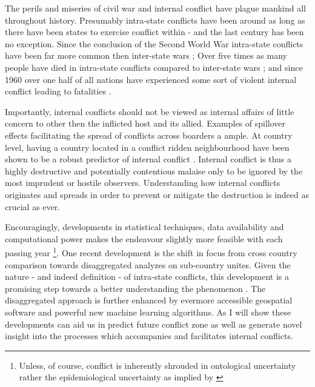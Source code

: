 \documentclass[a4paper]{article}
\begin{document}
The perils and miseries of civil war and internal conflict have plague mankind all throughout history. Presumably intra-state conflicts have been around as long as there have been states to exercise conflict within - and the last century has been no exception. Since the conclusion of the Second World War intra-state conflicts have been far more common then inter-state wars \citep[563]{Collier_Hoeffler_2004}; Over five times as many people have died in intra-state conflicts compared to inter-state wars \citep[563]{Collier_Hoeffler_2004}; and since 1960 over one half of all nations have experienced some sort of violent internal conflict leading to fatalities \citep[3-4]{Blattman_Miguel_2010}.\par

Importantly, internal conflicts should not be viewed as internal affairs of little concern to other then the inflicted host and its allied. Examples of spillover effects facilitating the spread of conflicts across boarders a ample. At country level, having a country located in a conflict ridden neighbourhood have been shown to be a robust predictor of internal conflict \citep{Hegre_Sambanis_2006,Goldstone_2010}. Internal conflict is thus a highly destructive and potentially contentious malaise only to be ignored by the most imprudent or hostile observers. Understanding how internal conflicts originates and spreads in order to prevent or mitigate the destruction is indeed as crucial as ever.\par

Encouragingly, developments in statistical techniques, data availability and computational power makes the endeavour slightly more feasible with each passing year \footnote{Unless, of course, conflict is inherently shrouded in ontological uncertainty rather the epidemiological uncertainty as implied by \cite{Gartzke_1999}}. One recent development is the shift in focus from cross country comparison towards disaggregated analyzes on sub-country unites. Given the nature - and indeed definition - of intra-state conflicts, this development is a promising step towards a better understanding the phenomenon \citep{Cederman_Gleditsch_2009}. The disaggregated approach is further enhanced by evermore accessible geospatial software and powerful new machine learning algorithms. As I will show these developments can aid us in predict future conflict zone as well as generate novel insight into the processes which accompanies and facilitates internal conflicts.\par
\end{document}
